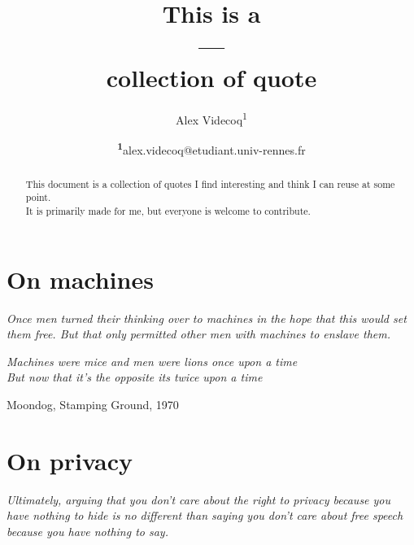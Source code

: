 \documentclass[
  a4paper, %
  12pt, %
  unnumberedsections, %
  twoside, %
  xcolor = {dvipsnames}
]{class}
\title{This is a\\---\\collection of quote} %
\author{%
  Alex Videcoq\textsuperscript{1}
}
\date{\footnotesize\textsuperscript{\textbf{1}}alex.videcoq@etudiant.univ-rennes.fr}
\begin{document}
\maketitle

\begin{abstract}
  \noindent This document is a collection of quotes I find
  interesting and think I can reuse at some point.\\
  It is primarily made for me, but everyone is welcome to contribute.
\end{abstract}

\section{On machines}
\textit{Once men turned their thinking over to machines in the hope
  that this would set them free.
But that only permitted other men with machines to enslave them.}\par
\cite{herbert_dune_1965} \par
\noindent
\textit{Machines were mice and men were lions once upon a time\\
But now that it's the opposite its twice upon a time}\par
Moondog, Stamping Ground, 1970

\section{On privacy}
\textit{Ultimately, arguing that you don't care about the right to
  privacy because you have nothing to hide is no different than saying
you don't care about free speech because you have nothing to say.}\par
\cite{snowden_privacy_2015} \par
\pagebreak
\printbibliography

\end{document}

